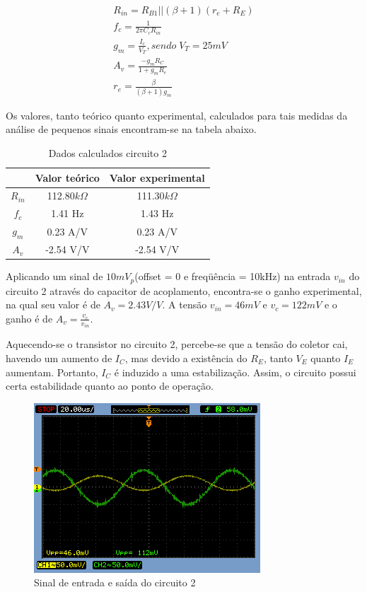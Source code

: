 \documentclass[a4paper]{article} %
\begin{document}
\begin{eqnarray}
R_{in}=R_{B1}||(\beta+1)(r_{e}+R_E)\\
f_c=\frac{1}{2\pi C_cR_{in}}\\
g_m=\frac{I_c}{V_T},sendo \; V_T = 25 mV\\
A_v=\frac{-g_mR_C}{1+g_mR_e}\\
r_{e}=\frac{\beta}{(\beta+1)g_m}
\end{eqnarray}

Os valores, tanto teórico quanto experimental, calculados para tais medidas da análise
de pequenos sinais encontram-se na tabela abaixo.

\begin{table}[h!]
\begin{centering}
\begin{tabular}{ccc}
\hline 
 & Valor teórico & Valor experimental\tabularnewline
\hline
\hline 
$R_{in}$ & 112.80$k\Omega$ & 111.30$k\Omega$\tabularnewline
$f_{c}$ & 1.41 Hz & 1.43 Hz\tabularnewline
$g_{m}$ & 0.23 A/V & 0.23 A/V\tabularnewline
$A_{v}$ & -2.54 V/V & -2.54 V/V\tabularnewline
\hline
\end{tabular}
\par\end{centering}

\caption{Dados calculados circuito 2}

\end{table}
%
Aplicando um sinal de $10mV_p$(offset = 0 e freqüência = 10kHz) na entrada $v_{in}$
do circuito 2 através do capacitor de acoplamento, encontra-se o ganho experimental, na qual seu
valor é de $A_v=2.43V/V$. A tensão $v_{in}=46mV$ e $v_c=122mV$ e o ganho é de  $A_v=\frac{v_c}{v_{in}}$.

Aquecendo-se o transistor no circuito 2, percebe-se que a tensão do coletor
cai, havendo um aumento de $I_C$, mas devido a existência do $R_E$, tanto $V_E$ quanto $I_E$ aumentam. Portanto, $I_C$ é induzido a uma estabilização.
Assim, o circuito possui certa estabilidade quanto ao ponto de operação.

\begin{figure}[h!]
\begin{centering}
\includegraphics[scale=0.5]{figuras03/2} \caption{Sinal de entrada e saída do circuito 2 \label{fig:3}}
\par\end{centering}
\end{figure}
\end{document}
